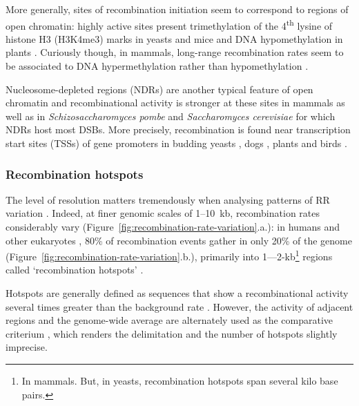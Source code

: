 More generally, sites of recombination initiation seem to correspond to regions of open chromatin: highly active sites present trimethylation of the 4\textsuperscript{th} lysine of histone H3 (H3K4me3) marks in yeasts \citep{borde2009histone} and mice \citep{buard2009distinct} and DNA hypomethylation in plants \citep{maloisel1998suppression,melamed-bessudo2012deficiency,mirouze2012loss}.
Curiously though, in mammals, long-range recombination rates seem to be associated to DNA hypermethylation rather than hypomethylation \citep{sigurdsson2009hapmap,zeng2014specific}.

Nucleosome-depleted regions (NDRs) are another typical feature of open chromatin and recombinational activity is stronger at these sites in mammals \citep[reviewed in \citealp{jabbari2019common}]{getun2010nucleosome,lange2016landscape,yamada2017genomic} as well as in \textit{Schizosaccharomyces pombe} \citep{decastro2012nucleosomal} and \textit{Saccharomyces cerevisiae} \citep{wu1994meiosisinduced,berchowitz2009positive} for which NDRs host most DSBs.
More precisely, recombination is found near transcription start sites (TSSs) of gene promoters in budding yeasts \citep{baudat1997clustering, petes2001meiotic, mancera2008highresolution}, dogs \citep{auton2013genetic,campbell2016pedigreebased}, plants \citep{hellsten2013finescale,choi2018nucleosomes} and birds \citep{singhal2015stable}.



\subsubsection{Recombination hotspots}

The level of resolution matters tremendously when analysing patterns of RR variation \citep[reviewed in][]{smukowski2011recombination}.
Indeed, at finer genomic scales of 1–10~kb, recombination rates considerably vary (Figure~\ref{fig:recombination-rate-variation}.a.): in humans \citep{mcvean2004finescale,the1000genomesprojectconsortium2010map} and other eukaryotes \citep{mezard2015where}, 80\% of recombination events gather in only 20\% of the genome (Figure~\ref{fig:recombination-rate-variation}.b.), primarily into 1—2-kb\footnote{In mammals. But, in yeasts, recombination hotspots span several kilo base pairs.} regions called ‘recombination hotspots’ \citep{myers2005finescale}.

Hotspots are generally defined as sequences that show a recombinational activity several times greater than the background rate \citep{crawford2004evidence,stapley2017variation}. 
However, the activity of adjacent regions and the genome-wide average are alternately used as the comparative criterium \citep{demassy2013initiation}, which renders the delimitation and the number of hotspots slightly imprecise.

